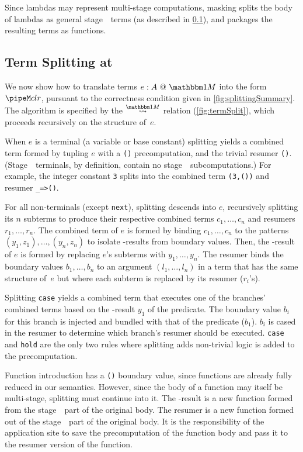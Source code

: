 \begin{abstrsyn}
Since lambdas may represent multi-stage computations, 
masking splits the body of lambdas as general stage~\bbone\ terms (as described in \ref{sec:split-one}), 
and packages the resulting terms as functions.

\subsection{Term Splitting at \bbonem}
\label{sec:split-one}

We now show how to translate terms $\colone e A$ into the form $\pipeM c l r$,
pursuant to the correctness condition given in \ref{fig:splittingSummary}.
The algorithm is specified by the $\splitonesym$ relation (\cref{fig:termSplit}), 
which proceeds recursively on the structure of~$e$.

When $e$ is a terminal (a variable or base constant)
splitting yields a combined term formed by tupling $e$ with a \texttt{()} precomputation, 
and the trivial resumer \texttt{()}. 
(Stage~\bbone\ terminals, by definition, contain no stage~\bbtwo\ subcomputations.)  
For example, the integer constant \texttt{3} splits into the combined term \texttt{(3,())} and resumer \texttt{\_=>()}.

For all non-terminals (except \texttt{next}),
splitting descends into $e$, recursively splitting its $n$ subterms
to produce their respective combined terms $c_1,\ldots,c_n$ and resumers $r_1, \ldots, r_n$.
The combined term of $e$ is formed by binding $c_1,\ldots,c_n$
to the patterns $(y_1,z_1),\ldots,(y_n,z_n)$
to isolate \bbone-results from boundary values. Then,
the \bbone-result of $e$ is formed by replacing $e$'s subterms with $y_1,\ldots,y_n$.
The resumer binds the boundary values $b_1,\ldots,b_n$ to an
argument $(l_1,\ldots,l_n)$ in a term that has the same structure
of~$e$ but where each subterm is replaced by its resumer ($r_i$'s).

Splitting {\tt case} yields a combined term that executes one of the branches' combined terms based on the \bbone-result $y_1$ of the predicate.
The boundary value $b_i$ for this branch is injected and bundled with that of the predicate ($b_1$).   
$b_i$ is cased in the resumer to determine which branch's resumer should be executed.
{\tt case} and \texttt{hold} are the only two rules where splitting adds non-trivial logic is added to the precomputation.

Function introduction has a \texttt{()} boundary value,
since functions are already fully reduced in our semantics.
However, since the body of a function may itself be multi-stage, splitting must continue into it.
The \bbone-result is a new function formed from the stage~\bbone\ part of the original body.
The resumer is a new function formed out of the stage~\bbtwo\ part of the original body.
It is the responsibility of the application site to save the precomputation of the function body
and pass it to the resumer version of the function.


\end{abstrsyn}
